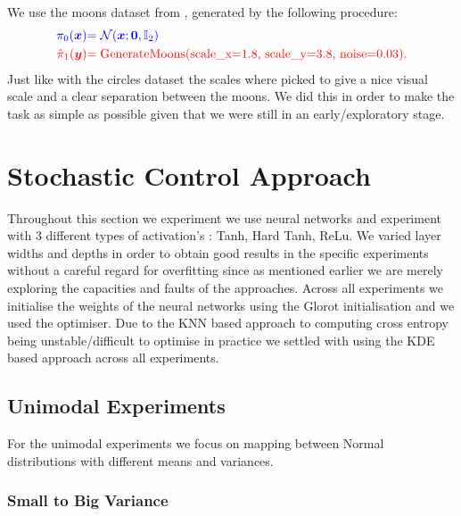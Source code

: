 \documentclass[a4paper,12pt,twoside,openright]{report}
\theoremstyle{definition}
\begin{document}
We use the moons dataset from \cite{pedregosa2011scikit}, generated by the following procedure:
\begin{align*}
     \color{blue}{\pi_0({\bm{x}})} &\color{blue}{= {\mathcal{N}}({\bm{x}}; {\bm{0}},  \mathbb{I}_2)} \\
    \color{red}{\hat{\pi}_1({\bm{y}})} &\color{red}{= \text{GenerateMoons(scale\_x=1.8, scale\_y=3.8, noise=0.03)}}.
\end{align*}
Just like with the circles dataset the scales where picked to give a nice visual scale and a clear separation between the moons. We did this in order to make the task as simple as possible given that we were still in an early/exploratory stage.


\section{Stochastic Control Approach}

Throughout this section we experiment we use neural networks \citep{lecun2015deep} and experiment with 3 different types of activation's : Tanh, Hard Tanh, ReLu.  We varied layer widths and depths in order  to obtain good results in the specific experiments without a careful regard for overfitting since as mentioned earlier we are merely exploring the capacities and faults of the approaches. Across all experiments we initialise the weights of the neural networks using the Glorot initialisation \citep{glorot2010understanding} and we used the \cite{duchi2011adaptive} optimiser. Due to the KNN based approach to computing cross entropy being unstable/difficult to optimise in practice we settled with using the KDE based approach across all experiments.

\subsection{Unimodal Experiments}
For the unimodal experiments we focus on mapping between Normal distributions with different means and variances.
\subsubsection{Small to Big Variance}
\end{document}
